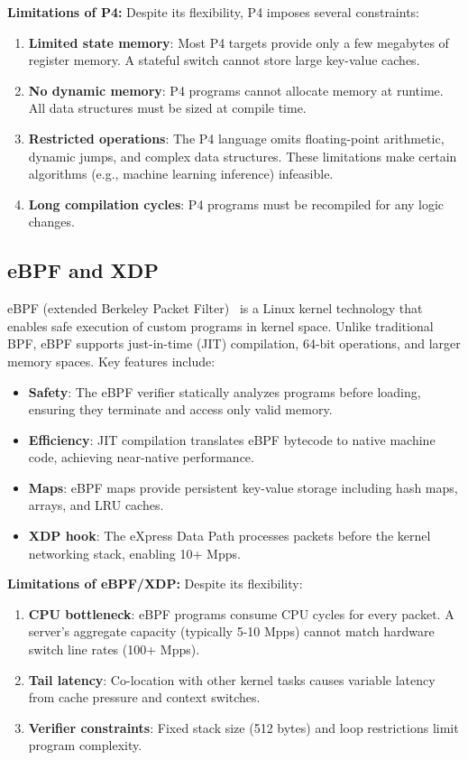 \documentclass[sigconf,anonymous,10pt]{acmart}
\begin{document}
\textbf{Limitations of P4:} Despite its flexibility, P4 imposes several constraints:

\begin{enumerate}
    \item \textbf{Limited state memory}: Most P4 targets provide only a few megabytes of register memory. A stateful switch cannot store large key-value caches.
    \item \textbf{No dynamic memory}: P4 programs cannot allocate memory at runtime. All data structures must be sized at compile time.
    \item \textbf{Restricted operations}: The P4 language omits floating-point arithmetic, dynamic jumps, and complex data structures. These limitations make certain algorithms (e.g., machine learning inference) infeasible.
    \item \textbf{Long compilation cycles}: P4 programs must be recompiled for any logic changes.
\end{enumerate}

\subsection{eBPF and XDP}
eBPF (extended Berkeley Packet Filter)~\cite{ebpf} is a Linux kernel technology that enables safe execution of custom programs in kernel space. Unlike traditional BPF, eBPF supports just-in-time (JIT) compilation, 64-bit operations, and larger memory spaces. Key features include:

\begin{itemize}
    \item \textbf{Safety}: The eBPF verifier statically analyzes programs before loading, ensuring they terminate and access only valid memory.
    \item \textbf{Efficiency}: JIT compilation translates eBPF bytecode to native machine code, achieving near-native performance.
    \item \textbf{Maps}: eBPF maps provide persistent key-value storage including hash maps, arrays, and LRU caches.
    \item \textbf{XDP hook}: The eXpress Data Path processes packets before the kernel networking stack, enabling 10+ Mpps.
\end{itemize}

\textbf{Limitations of eBPF/XDP:} Despite its flexibility:

\begin{enumerate}
    \item \textbf{CPU bottleneck}: eBPF programs consume CPU cycles for every packet. A server's aggregate capacity (typically 5-10 Mpps) cannot match hardware switch line rates (100+ Mpps).
    \item \textbf{Tail latency}: Co-location with other kernel tasks causes variable latency from cache pressure and context switches.
    \item \textbf{Verifier constraints}: Fixed stack size (512 bytes) and loop restrictions limit program complexity.
\end{enumerate}
\end{document}
